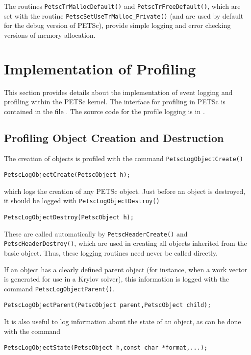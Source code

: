 The routines \lstinline{PetscTrMallocDefault()} and \lstinline{PetscTrFreeDefault()}, which are set with the routine \lstinline{PetscSetUseTrMalloc_Private()} (and are used by default for the debug version of PETSc), provide simple logging and error checking versions of memory allocation.



\section{Implementation of Profiling}
\label{sec:profimpl}

This section provides details about the implementation of event
logging and profiling within the PETSc kernel.
The interface for profiling in PETSc is contained in the file
\href{http://www.mcs.anl.gov/petsc/petsc-master/include/petsclog.h.html}{}. The source code for the profile logging
is in .

\subsection{Profiling Object Creation and Destruction}

The creation of objects is profiled with the command
 \lstinline{PetscLogObjectCreate()}
\begin{lstlisting}
PetscLogObjectCreate(PetscObject h);
\end{lstlisting}
which logs the creation of any PETSc object.
Just before an object is destroyed, it should be  logged with
\lstinline{PetscLogObjectDestroy()}
\begin{lstlisting}
PetscLogObjectDestroy(PetscObject h);
\end{lstlisting}
These are called automatically by \lstinline{PetscHeaderCreate()} and
\lstinline{PetscHeaderDestroy()}, which are used in creating all objects
inherited from the basic object. Thus, these logging routines need
never be called directly.

If an object has a clearly defined parent object (for instance, when
a work vector is generated for use in a Krylov solver), this information
is logged with the command \lstinline{PetscLogObjectParent()}.
\begin{lstlisting}
PetscLogObjectParent(PetscObject parent,PetscObject child);
\end{lstlisting}
It is also useful to log information about the state of an object, as can
be done with the command
\begin{lstlisting}
PetscLogObjectState(PetscObject h,const char *format,...);
\end{lstlisting}

